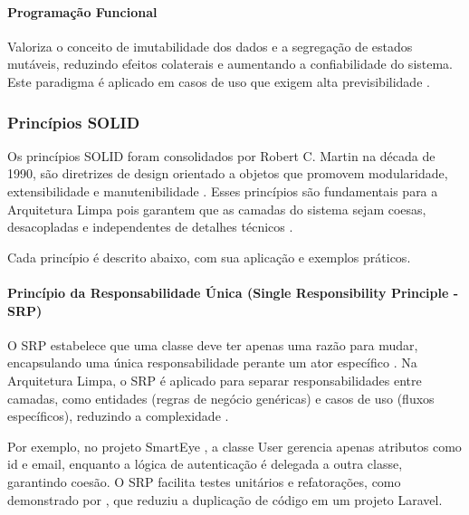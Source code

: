             \paragraph{Programação Funcional}
                \par Valoriza o conceito de imutabilidade dos dados e a segregação de estados mutáveis, reduzindo efeitos colaterais e aumentando a confiabilidade do sistema. Este paradigma é aplicado em casos de uso que exigem alta previsibilidade \cite{livro:martin:cleanarch}.
                
        \subsubsection{Princípios SOLID}
            \par Os princípios SOLID foram consolidados por Robert C. Martin na década de 1990, são diretrizes de design orientado a objetos que promovem modularidade, extensibilidade e manutenibilidade \cite{livro:martin:cleanarch}. Esses princípios são fundamentais para a Arquitetura Limpa pois garantem que as camadas do sistema sejam coesas, desacopladas e independentes de detalhes técnicos \cite{livro:martin:cleanarch}. 
            
            \par Cada princípio é descrito abaixo, com sua aplicação e exemplos práticos.

            \paragraph{Princípio da Responsabilidade Única (Single Responsibility Principle - SRP)}
                \par O SRP estabelece que uma classe deve ter apenas uma razão para mudar, encapsulando uma única responsabilidade perante um ator específico \cite{livro:martin:cleanarch}. Na Arquitetura Limpa, o SRP é aplicado para separar responsabilidades entre camadas, como entidades (regras de negócio genéricas) e casos de uso (fluxos específicos), reduzindo a complexidade \cite{livro:martin:cleanarch}. 
                
                \par Por exemplo, no projeto SmartEye \cite{artigo:dantas:2021}, a classe User gerencia apenas atributos como id e email, enquanto a lógica de autenticação é delegada a outra classe, garantindo coesão. O SRP facilita testes unitários e refatorações, como demonstrado por \cite{inproceedings:nugroho:2022}, que reduziu a duplicação de código em um projeto Laravel.

